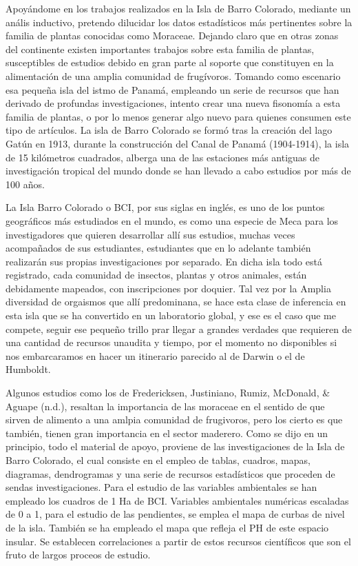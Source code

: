 \documentclass[11pt,]{article}
\begin{document}
Apoyándome en los trabajos realizados en la Isla de Barro Colorado,
mediante un anális inductivo, pretendo dilucidar los datos estadísticos
más pertinentes sobre la familia de plantas conocidas como Moraceae.
Dejando claro que en otras zonas del continente existen importantes
trabajos sobre esta familia de plantas, susceptibles de estudios debido
en gran parte al soporte que constituyen en la alimentación de una
amplia comunidad de frugívoros. Tomando como escenario esa pequeña isla
del istmo de Panamá, empleando un serie de recursos que han derivado de
profundas investigaciones, intento crear una nueva fisonomía a esta
familia de plantas, o por lo menos generar algo nuevo para quienes
consumen este tipo de artículos. La isla de Barro Colorado se formó tras
la creación del lago Gatún en 1913, durante la construcción del Canal de
Panamá (1904-1914), la isla de 15 kilómetros cuadrados, alberga una de
las estaciones más antiguas de investigación tropical del mundo donde se
han llevado a cabo estudios por más de 100 años.

La Isla Barro Colorado o BCI, por sus siglas en inglés, es uno de los
puntos geográficos más estudiados en el mundo, es como una especie de
Meca para los investigadores que quieren desarrollar allí sus estudios,
muchas veces acompañados de sus estudiantes, estudiantes que en lo
adelante también realizarán sus propias investigaciones por separado. En
dicha isla todo está registrado, cada comunidad de insectos, plantas y
otros animales, están debidamente mapeados, con inscripciones por
doquier. Tal vez por la Amplia diversidad de orgaismos que allí
predominana, se hace esta clase de inferencia en esta isla que se ha
convertido en un laboratorio global, y ese es el caso que me compete,
seguir ese pequeño trillo prar llegar a grandes verdades que requieren
de una cantidad de recursos unaudita y tiempo, por el momento no
disponibles si nos embarcaramos en hacer un itinerario parecido al de
Darwin o el de Humboldt.

Algunos estudios como los de Fredericksen, Justiniano, Rumiz, McDonald,
\& Aguape (n.d.), resaltan la importancia de las moraceae en el sentido
de que sirven de alimento a una amlpia comunidad de frugivoros, pero los
cierto es que también, tienen gran importancia en el sector maderero.
Como se dijo en un principio, todo el material de apoyo, proviene de las
investigaciones de la Isla de Barro Colorado, el cual consiste en el
empleo de tablas, cuadros, mapas, diagramas, dendrogramas y una serie de
recursos estadísticos que proceden de sendas investigaciones. Para el
estudio de las variables ambientales se han empleado los cuadros de 1 Ha
de BCI. Variables ambientales numéricas escaladas de 0 a 1, para el
estudio de las pendientes, se emplea el mapa de curbas de nivel de la
isla. También se ha empleado el mapa que refleja el PH de este espacio
insular. Se establecen correlaciones a partir de estos recursos
científicos que son el fruto de largos proceos de estudio.
\end{document}
